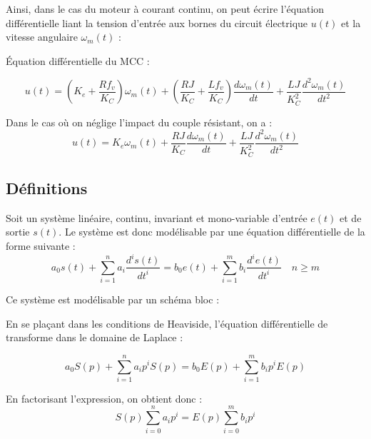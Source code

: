 \documentclass[10pt,fleqn]{article} %
\begin{document}
Ainsi, dans le cas du moteur à courant continu, on peut écrire l'équation différentielle liant la tension d'entrée aux bornes du circuit électrique $u(t)$ et la vitesse angulaire $\omega_m(t)$ :

\begin{exemple}
Équation différentielle du MCC :

$$
u(t)= 
 \left( K_e + \dfrac{R f_v}{K_C}\right) \omega_m(t)
+\left( \dfrac{RJ}{K_C} + \dfrac{Lf_v}{K_C} \right)\dfrac{d\omega_m(t)}{dt} 
+\dfrac{LJ}{K_C^2} \dfrac{d^2\omega_m(t)}{dt^2}  
$$

Dans le cas où on néglige l'impact du couple résistant, on a :
$$
u(t)= 
 K_e \omega_m(t)
 +\dfrac{RJ}{K_C} \dfrac{d\omega_m(t)}{dt} 
+\dfrac{LJ}{K_C^2} \dfrac{d^2\omega_m(t)}{dt^2}  
$$
\end{exemple}

\subsection{Définitions}
Soit un système linéaire, continu, invariant et mono-variable d'entrée $e(t)$
et de sortie $s(t)$. Le système est donc modélisable par une équation
différentielle de la forme suivante :
$$
a_0 s(t) + \sum\limits_{i=1}^{n} a_i\dfrac{d^is(t)}{dt^i} = 
b_0 e(t) + \sum\limits_{i=1}^{m} b_i\dfrac{d^ie(t)}{dt^i}
\quad n\geq m
$$

\begin{minipage}[c]{.6\linewidth}
Ce système est modélisable par un schéma bloc : 
\end{minipage}\hfill
\begin{minipage}[c]{.35\linewidth}
\end{minipage}


En se plaçant dans les conditions de Heaviside, l'équation différentielle de
transforme dans le domaine de Laplace :

$$
a_0 S(p) + \sum\limits_{i=1}^{n} a_i p^i S(p) = 
b_0 E(p) + \sum\limits_{i=1}^{m} b_i p^i E(p) 
$$

En factorisant l'expression, on obtient donc : 
$$
S(p) \sum\limits_{i=0}^{n} a_i p^i  = 
E(p) \sum\limits_{i=0}^{m} b_i p^i 
$$
\end{document}
